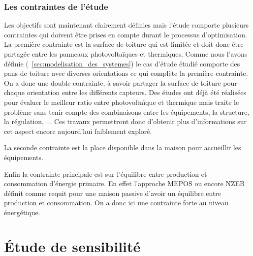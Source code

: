 \subsubsection{Les contraintes de l’étude} %
\label{ssub:les_contraintes_de_l_etude}
Les objectifs sont maintenant clairement définies mais l’étude comporte plusieurs
contraintes qui doivent être prises en compte durant le processus d’optimisation.
La première contrainte est la surface de toiture qui est limitée et doit donc être
partagée entre les panneaux photovoltaïques et thermiques. Comme nous l’avons définie
(~\autoref{sec:modelisation_des_systemes}) le cas d’étude étudié comporte des pans
de toiture avec diverses orientations ce qui complète la première contrainte.
On a donc une double contrainte, à savoir
partager la surface de toiture pour chaque orientation entre les différents capteurs.
Des études ont déjà été réalisées pour évaluer le meilleur ratio entre photovoltaïque
et thermique mais traite le problème sans tenir compte des combinaisons
entre les équipements, la structure, la régulation, ... Ces travaux permettront donc
d’obtenir plus d’informations sur cet aspect encore aujourd’hui faiblement exploré.

La seconde contrainte est la place disponible dans la maison pour accueillir les
équipements.

Enfin la contrainte principale est sur l’équilibre entre production et consommation
d’énergie primaire. En effet l’approche MEPOS ou encore NZEB définit comme requit
pour une maison passive d’avoir un équilibre entre production et consommation.
On a donc ici une contrainte forte au niveau énergétique.




\section{Étude de sensibilité} %
\label{sec:etude_de_sensibilite}




